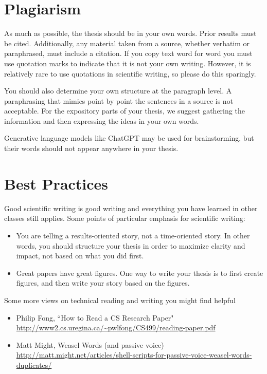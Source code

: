 \documentclass[midd]{thesis}
\begin{document}
\section{Plagiarism}
\label{sec:Plag}
As much as possible, the thesis should be in your own words. Prior results must be cited. Additionally, any material taken from a source, whether verbatim or paraphrased, must include a citation. If you copy text word for word you must use quotation marks to indicate that it is not your own writing. However, it is relatively rare to use quotations in scientific writing, so please do this sparingly.

You should also determine your own structure at the paragraph level. A paraphrasing that mimics point by point the sentences in a source is not acceptable.
For the expository parts of your thesis, we suggest gathering the information and then expressing the ideas in your own words. 

Generative language models like ChatGPT may be used for brainstorming, but their words should not appear anywhere in your thesis. 

\section{Best Practices}
\label{app:bestPractices}

Good scientific writing is good writing and everything you have learned in other classes still applies. Some points of particular emphasis for scientific writing:

\begin{itemize}
    \item You are telling a results-oriented story, not a time-oriented story. In other words, you should structure your thesis in order to maximize clarity and impact, not based on what you did first.
    \item Great papers have great figures. One way to write your thesis is to first create figures, and then write your story based on the figures.
\end{itemize}

Some more views on technical reading and writing you might find helpful
\begin{itemize}
    \item Philip Fong, ``How to Read a CS Research Paper" \url{http://www2.cs.uregina.ca/~pwlfong/CS499/reading-paper.pdf}
    \item Matt Might, Weasel Words (and passive voice) \url{http://matt.might.net/articles/shell-scripts-for-passive-voice-weasel-words-duplicates/}
\end{itemize}
\end{document}
